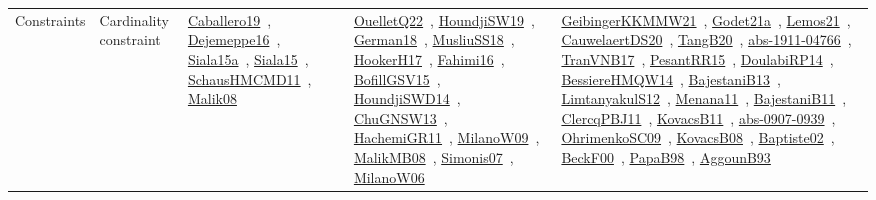 {\begin{longtable}{lp{3cm}>{\raggedright\arraybackslash}p{6cm}>{\raggedright\arraybackslash}p{6cm}>{\raggedright\arraybackslash}p{8cm}}
Constraints & Cardinality constraint & \href{../works/Caballero19.pdf}{Caballero19}~\cite{Caballero19}, \href{../works/Dejemeppe16.pdf}{Dejemeppe16}~\cite{Dejemeppe16}, \href{../works/Siala15a.pdf}{Siala15a}~\cite{Siala15a}, \href{../works/Siala15.pdf}{Siala15}~\cite{Siala15}, \href{../works/SchausHMCMD11.pdf}{SchausHMCMD11}~\cite{SchausHMCMD11}, \href{../works/Malik08.pdf}{Malik08}~\cite{Malik08} & \href{../works/OuelletQ22.pdf}{OuelletQ22}~\cite{OuelletQ22}, \href{../works/HoundjiSW19.pdf}{HoundjiSW19}~\cite{HoundjiSW19}, \href{../works/German18.pdf}{German18}~\cite{German18}, \href{../works/MusliuSS18.pdf}{MusliuSS18}~\cite{MusliuSS18}, \href{../works/HookerH17.pdf}{HookerH17}~\cite{HookerH17}, \href{../works/Fahimi16.pdf}{Fahimi16}~\cite{Fahimi16}, \href{../works/BofillGSV15.pdf}{BofillGSV15}~\cite{BofillGSV15}, \href{../works/HoundjiSWD14.pdf}{HoundjiSWD14}~\cite{HoundjiSWD14}, \href{../works/ChuGNSW13.pdf}{ChuGNSW13}~\cite{ChuGNSW13}, \href{../works/HachemiGR11.pdf}{HachemiGR11}~\cite{HachemiGR11}, \href{../works/MilanoW09.pdf}{MilanoW09}~\cite{MilanoW09}, \href{../works/MalikMB08.pdf}{MalikMB08}~\cite{MalikMB08}, \href{../works/Simonis07.pdf}{Simonis07}~\cite{Simonis07}, \href{../works/MilanoW06.pdf}{MilanoW06}~\cite{MilanoW06} & \href{../works/GeibingerKKMMW21.pdf}{GeibingerKKMMW21}~\cite{GeibingerKKMMW21}, \href{../works/Godet21a.pdf}{Godet21a}~\cite{Godet21a}, \href{../works/Lemos21.pdf}{Lemos21}~\cite{Lemos21}, \href{../works/CauwelaertDS20.pdf}{CauwelaertDS20}~\cite{CauwelaertDS20}, \href{../works/TangB20.pdf}{TangB20}~\cite{TangB20}, \href{../works/abs-1911-04766.pdf}{abs-1911-04766}~\cite{abs-1911-04766}, \href{../works/TranVNB17.pdf}{TranVNB17}~\cite{TranVNB17}, \href{../works/PesantRR15.pdf}{PesantRR15}~\cite{PesantRR15}, \href{../works/DoulabiRP14.pdf}{DoulabiRP14}~\cite{DoulabiRP14}, \href{../works/BessiereHMQW14.pdf}{BessiereHMQW14}~\cite{BessiereHMQW14}, \href{../works/BajestaniB13.pdf}{BajestaniB13}~\cite{BajestaniB13}, \href{../works/LimtanyakulS12.pdf}{LimtanyakulS12}~\cite{LimtanyakulS12}, \href{../works/Menana11.pdf}{Menana11}~\cite{Menana11}, \href{../works/BajestaniB11.pdf}{BajestaniB11}~\cite{BajestaniB11}, \href{../works/ClercqPBJ11.pdf}{ClercqPBJ11}~\cite{ClercqPBJ11}, \href{../works/KovacsB11.pdf}{KovacsB11}~\cite{KovacsB11}, \href{../works/abs-0907-0939.pdf}{abs-0907-0939}~\cite{abs-0907-0939}, \href{../works/OhrimenkoSC09.pdf}{OhrimenkoSC09}~\cite{OhrimenkoSC09}, \href{../works/KovacsB08.pdf}{KovacsB08}~\cite{KovacsB08}, \href{../works/Baptiste02.pdf}{Baptiste02}~\cite{Baptiste02}, \href{../works/BeckF00.pdf}{BeckF00}~\cite{BeckF00}, \href{../works/PapaB98.pdf}{PapaB98}~\cite{PapaB98}, \href{../works/AggounB93.pdf}{AggounB93}~\cite{AggounB93}\\

\end{longtable}}
